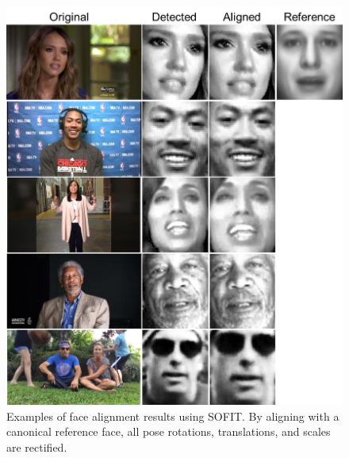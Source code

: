 \documentclass[10pt,journal]{IEEEtran}
\begin{document}
\begin{figure}[htbp]
	\centering
		\includegraphics[width=.8\columnwidth]{fig/suppliment.png}
	\caption{Examples of face alignment results using SOFIT. By aligning with a canonical reference face, all pose rotations, translations, and scales are rectified. }
	\label{fig:suppliment}
\end{figure}
\end{document}
